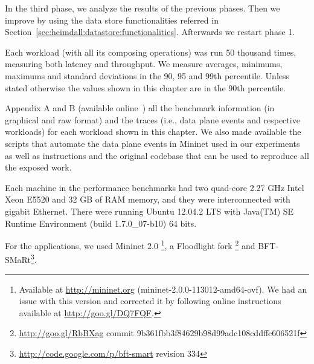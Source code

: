 In the third phase, we analyze the results of the previous phases.
Then we improve by using the data store functionalities referred in Section~\ref{sec:heimdall:datastore:functionalities}. 
Afterwards we restart phase 1. 

Each workload (with all its composing operations)  was run 50 thousand times, measuring both latency and throughput. 
We measure averages, minimums, maximums and standard deviations in the 90, 95 and 99th percentile. 
Unless stated otherwise the values shown in this chapter are in the 90th percentile. 

Appendix A and B (available online~\cite{support})  all the benchmark information (in graphical and raw format) and the traces (i.e., data plane events and respective workloads) for each workload shown in this chapter.  We also made available the scripts that automate the data plane events in Mininet used in our experiments as well as instructions and the original codebase that can be used to reproduce  all the exposed work. 

Each machine in the performance benchmarks had two quad-core 2.27 GHz Intel Xeon E5520 and 32 GB of RAM memory, and they were interconnected with gigabit Ethernet. 
There were running  Ubuntu 12.04.2 LTS with  Java(TM) SE Runtime Environment (build 1.7.0\_07-b10) 64 bits.

For the applications, we  used Mininet 2.0 \footnote{Available at \url{http://mininet.org} (mininet-2.0.0-113012-amd64-ovf). We had an issue with this version and corrected it by following online instructions available at \url{http://goo.gl/DQ7FQF}.},  a Floodlight fork \footnote{\url{http://goo.gl/RbBXag} commit 9b361fbb3f84629b98d99adc108cddffc606521f} and  BFT-SMaRt\footnote{\url{http://code.google.com/p/bft-smart} revision 334}.  


